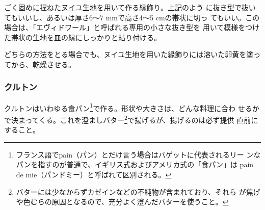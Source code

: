 \begin{recette}
ごく固めに捏ねた\protect\hyperlink{nouilles}{ヌイユ生地}を用いて作る縁飾り。上記のよう
に抜き型で抜いてもいいし、あるいは厚さ6〜7 mmで高さ4〜5 cmの帯状に切っ
てもいい。この場合は、「エヴィドワール」と呼ばれる専用の小さな抜き型を
用いて模様をつけた帯状の生地を皿の縁にしっかりと貼り付ける。

どちらの方法をとる場合でも、ヌイユ生地を用いた縁飾りには溶いた卵黄を塗ってから、乾燥させる。

\maeaki

\hypertarget{croutons}{%
\subsubsection{クルトン}\label{croutons}}



クルトンはいわゆる食パン\footnote{フランス語でpain（パン）とだけ言う場合はバゲットに代表されるリー
  ンなパンを指すのが普通で、イギリス式およびアメリカ式の「食パン」は
  pain de mie（パンドミー）と呼ばれて区別される。}で作る。形状や大きさは、どんな料理に合わ
せるかで決まってくる。これを澄ましバター\footnote{バターには少なからずカゼインなどの不純物が含まれており、それら
  が焦げや色むらの原因となるので、充分よく澄んだバターを使うこと。}で揚げるが、揚げるのは必ず提供
直前にすること。

\maeaki

\hypertarget{duxelles-seche}{%
}
\end{recette}
